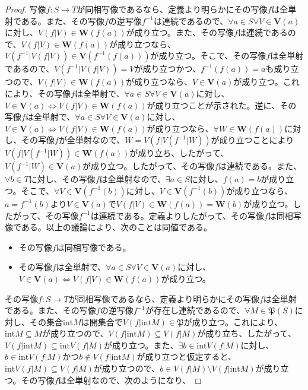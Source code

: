\documentclass[dvipdfmx]{jsarticle}
\begin{document}
\begin{proof}
写像$f:S \rightarrow T$が同相写像であるなら、定義より明らかにその写像$f$は全単射である。また、その写像$f$の逆写像$f^{- 1}$は連続であるので、$\forall a \in S\forall V \in \mathbf{V}(a)$に対し、$V\left( f|V \right) \in \mathbf{W}\left( f(a) \right)$が成り立つ。また、その写像$f$は連続であるので、$V\left( f|V \right) \in \mathbf{W}\left( f(a) \right)$が成り立つなら、$V\left( f^{- 1}|V\left( f|V \right) \right) \in \mathbf{V}\left( f^{- 1}\left( f(a) \right) \right)$が成り立つ。そこで、その写像$f$は全単射であるので、$V\left( f^{- 1}|V\left( f|V \right) \right) = V$が成り立つかつ、$f^{- 1}\left( f(a) \right) = a$も成り立つので、$V\left( f|V \right) \in \mathbf{W}\left( f(a) \right)$が成り立つなら、$V \in \mathbf{V}(a)$が成り立つ。これにより、その写像$f$は全単射で、$\forall a \in S\forall V \in \mathbf{V}(a)$に対し、$V \in \mathbf{V}(a) \Leftrightarrow V\left( f|V \right) \in \mathbf{W}\left( f(a) \right)$が成り立つことが示された。逆に、その写像$f$は全単射で、$\forall a \in S\forall V \in \mathbf{V}(a)$に対し、$V \in \mathbf{V}(a) \Leftrightarrow V\left( f|V \right) \in \mathbf{W}\left( f(a) \right)$が成り立つなら、$\forall W \in \mathbf{W}\left( f(a) \right)$に対し、その写像$f$が全単射なので、$W = V\left( f|V\left( f^{- 1}|W \right) \right)$が成り立つことにより$V\left( f|V\left( f^{- 1}|W \right) \right) \in \mathbf{W}\left( f(a) \right)$が成り立ち、したがって、$V\left( f^{- 1}|W \right) \in \mathbf{V}(a)$が成り立つ。したがって、その写像$f$は連続である。また、$\forall b \in T$に対し、その写像$f$は全単射なので、$\exists a \in S$に対し、$f(a) = b$が成り立つ。そこで、$\forall V \in \mathbf{V}\left( f^{- 1}(b) \right)$に対し、$V \in \mathbf{V}\left( f^{- 1}(b) \right)$が成り立つなら、$a = f^{- 1}(b)$より$V \in \mathbf{V}(a)$で$V\left( f|V \right) \in \mathbf{W}\left( f(a) \right) = \mathbf{W}(b)$が成り立つ。したがって、その写像$f^{- 1}$は連続である。定義よりしたがって、その写像$f$は同相写像である。以上の議論により、次のことは同値である。
\begin{itemize}
\item
  その写像$f$は同相写像である。
\item
  その写像$f$は全単射で、$\forall a \in S\forall V \in \mathbf{V}(a)$に対し、$V \in \mathbf{V}(a) \Leftrightarrow V\left( f|V \right) \in \mathbf{W}\left( f(a) \right)$が成り立つ。
\end{itemize}\par
その写像$f:S \rightarrow T$が同相写像であるなら、定義より明らかにその写像$f$は全単射である。また、その写像$f$の逆写像$f^{- 1}$が存在し連続であるので、$\forall M\in \mathfrak{P}(S)$に対し、その集合${\mathrm{int}}M$は開集合で$V\left( f|{\mathrm{int}}M \right) \in \mathfrak{P}$が成り立つ。これにより、${\mathrm{int}}M \subseteq M$が成り立つので、$V\left( f|{\mathrm{int}}M \right) \subseteq V\left( f|M \right)$が成り立ち、したがって、$V\left( f|{\mathrm{int}}M \right) \subseteq {\mathrm{int}}{V\left( f|M \right)}$が成り立つ。また、$\exists b \in {\mathrm{int}}{V\left( f|M \right)}$に対し、$b \in {\mathrm{int}}{V\left( f|M \right)}$かつ$b \notin V\left( f|{\mathrm{int}}M \right)$が成り立つと仮定すると、${\mathrm{int}}{V\left( f|M \right)} \subseteq V\left( f|M \right)$が成り立つので、$b \in V\left( f|M \right) \setminus V\left( f|{\mathrm{int}}M \right)$が成り立つ。その写像$f$は全単射なので、次のようになり、

\end{proof}
\end{document}

